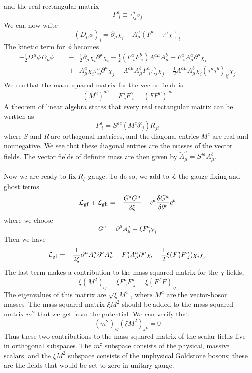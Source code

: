 and the real rectangular matrix
\[F^a_{\phantom{i}i} \equiv \tau^a_{ij}v_j\]
We can now write
\[(D_{\mu}\phi)_i = \partial_{\mu}\chi_i - A^a_{\mu}(F^a+\tau^a\chi)_i\]
The kinetic term for $\phi$ becomes
\begin{eqnarray}
-\frac{1}{2}D^{\mu}\phi D_{\mu}\phi = &-& \frac{1}{2}\partial_{\mu}\chi_i \partial^{\mu}\chi_i - \frac{1}{2}(F^a_{\phantom{i}i} F^b_{\phantom{i}i})A^{a\mu}A^b_{\mu} + F^a_{\phantom{i}i} A^a_{\mu}\partial^{\mu}\chi_i \nonumber \\
&+& A^a_{\mu}\chi_i \tau^a_{ij}\partial^{\mu}\chi_j - A^{a\mu}A^b_{\mu} F^a_{\phantom{i}i} \tau^b_{ij} \chi_j - \frac{1}{2}A^{a\mu}A^b_{\mu}\chi_i (\tau^a \tau^b)_{ij}\chi_j \nonumber
\end{eqnarray}
We see that the mass-squared matrix for the vector fields is
\[(M^2)^{ab} = F^a_{\phantom{i}i} F^b_{\phantom{i}i} = (FF^T)^{ab}\]
A theorem of linear algebra states that every real rectangular matrix can be written as
\[F^a_{\phantom{i}i} = S^{ac}(M^c\delta^c_{\phantom{i}j})R_{ji}\]
where $S$ and $R$ are orthogonal matrices, and the diagonal entries $M^c$ are real and nonnegative. We see that these diagonal entries are the masses of the vector fields. The vector fields of definite mass are then given by $\widetilde{A}^{a}_{\mu} = S^{ba}A^b_{\mu}$.
\\ \\
Now we are ready to fix $R_{\xi}$ gauge. To do so, we add to $\mathcal{L}$ the gauge-fixing and ghost terms
\[\mathcal{L}_{\rm gf} + \mathcal{L}_{\rm gh} = - \frac{G^aG^a}{2\xi} - \overline{c}^a\frac{\delta G^a}{\delta \theta^b} c^b \]
where we choose
\[G^a = \partial^{\mu}A^a_{\mu} - \xi F^a_{\phantom{i}i} 
\chi_i\]
Then we have
\[\mathcal{L}_{\rm gf} = -\frac{1}{2\xi} \partial^{\mu}A^a_{\mu} \partial^{\nu}A^a_{\nu} - F^a_{\phantom{i}i} A^a_{\mu}\partial^{\mu}\chi_i - \frac{1}{2}\xi (F^a_{\phantom{i}i} F^a_{\phantom{i}j})\chi_i\chi_j\]
The last term makes a contribution to the mass-squared matrix for the $\chi$ fields,
\[\xi(M^2)_{ij} = \xi F^a_{\phantom{i}i} F^a_{\phantom{i}j} = \xi(F^TF)_{ij}\]
The eigenvalues of this matrix are $\sqrt{\xi}M^a$ , where
$M^a$ are the vector-boson masses. The mass-squared matrix $\xi M^2$ should be added to the mass-squared matrix $m^2$ that we get from the potential. We can verify that
\[(m^2)_{ij}(\xi M^2)_{jk} = 0\]
Thus these two contributions to the mass-squared matrix of the scalar fields live in orthogonal subspaces. The $m^2$ subspace consists of the physical, massive scalars, and the $\xi M^2$ subspace consists of the unphysical Goldstone bosons; these are the fields that would be set to zero in unitary gauge.
